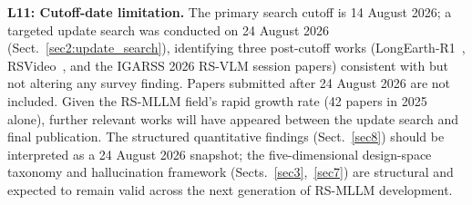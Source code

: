 \textbf{L11: Cutoff-date limitation.} The primary search cutoff is
14 August 2026; a targeted update search was conducted on 24 August 2026
(Sect.~\ref{sec2:update_search}), identifying three post-cutoff works
(LongEarth-R1~\cite{longearth_r1_2026}, RSVideo~\cite{rsvideo_2026},
and the IGARSS 2026 RS-VLM session papers) consistent with but not
altering any survey finding. Papers submitted after 24 August 2026 are
not included. Given the RS-MLLM field's rapid growth rate (42 papers in
2025 alone), further relevant works will have appeared between the update
search and final publication. The structured quantitative findings
(Sect.~\ref{sec8}) should be interpreted as a 24 August 2026 snapshot;
the five-dimensional design-space taxonomy and hallucination framework
(Sects.~\ref{sec3},~\ref{sec7}) are structural and expected to remain
valid across the next generation of RS-MLLM development.
